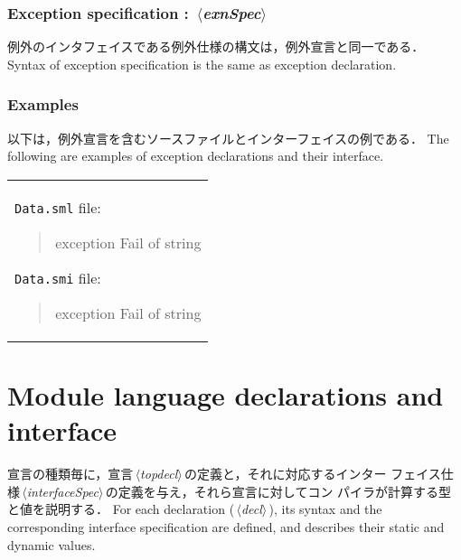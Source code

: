 \documentclass{jbook}
\newcommand{\txt}[2]{#2}
\newcommand{\code}[1]{\mbox{\large\tt #1}}
\newcommand{\nonterm}[1]{\mbox{$\,\langle$}{\it #1}\mbox{$\rangle\,$}}
\newenvironment{program}{\begin{quote}\begin{tt}}%
                        {\end{tt}\end{quote}}
\begin{document}
\subsection{\txt{例外仕様}{Exception specification} : \nonterm{exnSpec}}
\ifjp%
	例外のインタフェイスである例外仕様の構文は，例外宣言と同一である．
\else%
	Syntax of exception specification is the same as exception declaration.
\fi%

\subsection{\txt{例外宣言とインタフェイスの例}{Examples}}
\ifjp%
	以下は，例外宣言を含むソースファイルとインターフェイスの例である．
\else%
	The following are examples of exception declarations and their interface.
\fi%

\begin{center}
\begin{tabular}{l}
\begin{minipage}{0.9\textwidth}
\code{Data.sml} file:
\begin{program}
  exception Fail of string
\end{program}
\code{Data.smi} file:
\begin{program}
  exception Fail of string
\end{program}
\end{minipage}
\end{tabular}
\end{center}

\chapter{\txt{モジュール言語の宣言とインタフェイス}{Module language declarations and interface}}
\label{chap:reference:strdecls}
\ifjp%
	宣言の種類毎に，宣言\nonterm{topdecl}の定義と，それに対応するインター
フェイス仕様\nonterm{interfaceSpec}の定義を与え，それら宣言に対してコン
パイラが計算する型と値を説明する．
\else%
	For each declaration (\nonterm{decl}), its syntax and the
corresponding interface specification are defined, and describes 
their static and dynamic values.
\fi%
\end{document}
